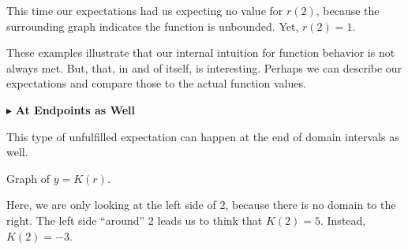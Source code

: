 \documentclass{ximera}
\begin{document}
This time our expectations had us expecting no value for $r(2)$, because the surrounding graph indicates the function is unbounded.  Yet, $r(2) = 1$.



















These examples illustrate that our internal intuition for function behavior is not always met.  But, that, in and of itself, is interesting.  Perhaps we can describe our expectations and compare those to the actual function values. 





$\blacktriangleright$ \textbf{At Endpoints as Well}

This type of unfulfilled expectation can happen at the end of domain intervals as well.






Graph of $y = K(r)$.

\begin{image}
\end{image}



Here, we are only looking at the left side of $2$, because there is no domain to the right.  The left side ``around'' $2$ leads us to think that $K(2) = 5$.  Instead, $K(2) = -3$. 
\end{document}

